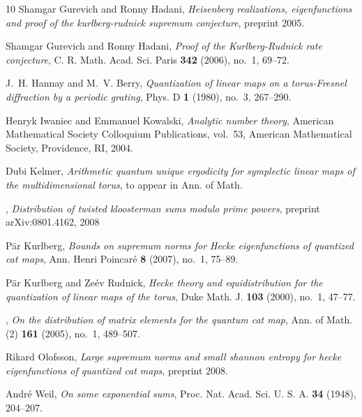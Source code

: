 \documentclass[12pt]{amsart}
\theoremstyle{definition}
\theoremstyle{remark}
\numberwithin{equation}{section}
\begin{document}
\begin{thebibliography}{10}
Shamgar Gurevich and Ronny Hadani, \emph{Heisenberg realizations,
  eigenfunctions and proof of the kurlberg-rudnick supremum conjecture}, preprint 2005.

Shamgar Gurevich and Ronny Hadani, \emph{Proof of the
{K}urlberg-{R}udnick rate
  conjecture}, C. R. Math. Acad. Sci. Paris \textbf{342} (2006), no.~1, 69--72.

J.~H. Hannay and M.~V. Berry, \emph{Quantization of linear maps on a
  torus-{F}resnel diffraction by a periodic grating}, Phys. D \textbf{1}
  (1980), no.~3, 267--290.

Henryk Iwaniec and Emmanuel Kowalski, \emph{Analytic number theory},
American
  Mathematical Society Colloquium Publications, vol.~53, American Mathematical
  Society, Providence, RI, 2004.

Dubi Kelmer, \emph{Arithmetic quantum unique ergodicity for
symplectic linear
  maps of the multidimensional torus}, to appear in Ann. of Math.

\bysame, \emph{Distribution of twisted kloosterman sums modulo prime
powers},
 preprint arXiv:0801.4162, 2008

P{\"a}r Kurlberg, \emph{Bounds on supremum norms for {H}ecke
eigenfunctions of
  quantized cat maps}, Ann. Henri Poincar\'e \textbf{8} (2007), no.~1, 75--89.

P{\"a}r Kurlberg and Ze{\'e}v Rudnick, \emph{Hecke theory and
equidistribution
  for the quantization of linear maps of the torus}, Duke Math. J. \textbf{103}
  (2000), no.~1, 47--77.


\bysame, \emph{On the distribution of matrix elements for the
quantum cat map},
  Ann. of Math. (2) \textbf{161} (2005), no.~1, 489--507.

Rikard Olofsson, \emph{Large supremum norms and small shannon
entropy for hecke
  eigenfunctions of quantized cat maps}, preprint 2008.

Andr{\'e} Weil, \emph{On some exponential sums}, Proc. Nat. Acad.
Sci. U. S. A.
  \textbf{34} (1948), 204--207.

\end{thebibliography}

\end{document}
